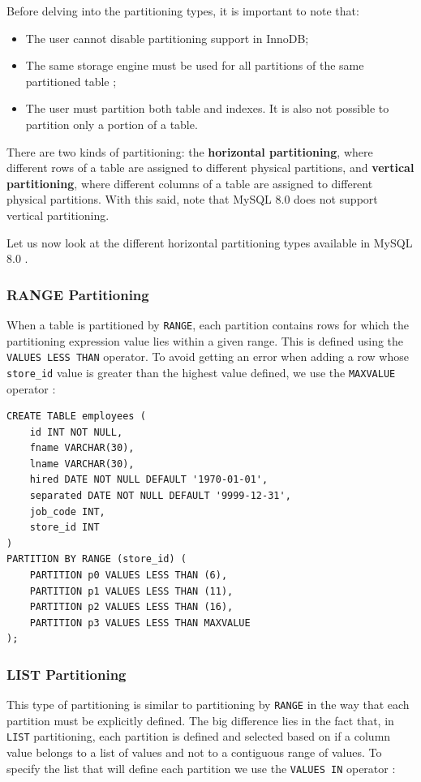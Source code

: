\documentclass[12pt]{article}
\begin{document}
Before delving into the partitioning types, it is important to note that:
\begin{itemize}
    \item The user cannot disable partitioning support in InnoDB;
    \item The same storage engine must be used for all partitions of the same partitioned table \parencite{PARTITIONING_OVERVIEW};
    \item The user must partition both table and indexes. It is also not possible to partition only a portion of a table.
\end{itemize}

There are two kinds of partitioning: the \textbf{horizontal partitioning}, where different rows of a table are assigned to different physical partitions, and \textbf{vertical partitioning}, where different columns of a table are assigned to different physical partitions. With this said, note that MySQL 8.0 does not support vertical partitioning.

Let us now look at the different horizontal partitioning types available in MySQL 8.0 \parencite{PARTITIONING_TYPES}.

\subsubsection{RANGE Partitioning}
When a table is partitioned by \verb|RANGE|, each partition contains rows for which the partitioning expression value lies within a given range. This is defined using the \verb|VALUES LESS THAN| operator.
To avoid getting an error when adding a row whose \verb|store_id| value is greater than the highest value defined, we use the \verb|MAXVALUE| operator \parencite{PARTITIONING_RANGE}:

\begin{verbatim}
CREATE TABLE employees (
    id INT NOT NULL,
    fname VARCHAR(30),
    lname VARCHAR(30),
    hired DATE NOT NULL DEFAULT '1970-01-01',
    separated DATE NOT NULL DEFAULT '9999-12-31',
    job_code INT,
    store_id INT
)
PARTITION BY RANGE (store_id) (
    PARTITION p0 VALUES LESS THAN (6),
    PARTITION p1 VALUES LESS THAN (11),
    PARTITION p2 VALUES LESS THAN (16),
    PARTITION p3 VALUES LESS THAN MAXVALUE
);\end{verbatim}

\subsubsection{LIST Partitioning}
This type of partitioning is similar to partitioning by \verb|RANGE| in the way that each partition must be explicitly defined. The big difference lies in the fact that, in \verb|LIST| partitioning, each partition is defined and selected based on if a column value belongs to a list of values and not to a contiguous range of values. 
To specify the list that will define each partition we use the \verb|VALUES IN| operator \parencite{PARTITIONING_LIST}:
\end{document}
